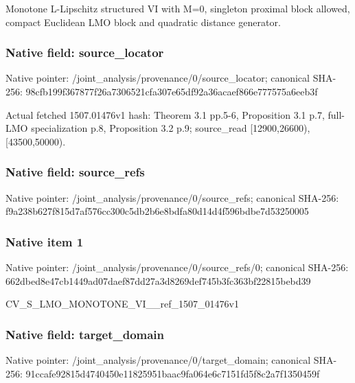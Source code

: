 \documentclass[10pt,a4paper]{article}
\begin{document}
\begingroup\raggedright\sloppy Monotone L-Lipschitz structured VI with M=\allowbreak{}0,\allowbreak{} singleton proximal block allowed,\allowbreak{} compact Euclidean LMO block and quadratic distance generator.\par\endgroup

\subsubsection{Native field: source\_\allowbreak{}locator}
Native pointer: /joint\_\allowbreak{}analysis/provenance/0/source\_\allowbreak{}locator; canonical SHA-256: 98cfb199f367877f26a7306521cfa307e65df92a36acaef866e777575a6eeb3f

\begingroup\raggedright\sloppy Actual fetched 1507.01476v1 hash:\allowbreak{} Theorem 3.1 pp.5-6,\allowbreak{} Proposition 3.1 p.7,\allowbreak{} full-LMO specialization p.8,\allowbreak{} Proposition 3.2 p.9;\allowbreak{} source\_\allowbreak{}read [12900,\allowbreak{}26600),\allowbreak{} [43500,\allowbreak{}50000).\par\endgroup

\subsubsection{Native field: source\_\allowbreak{}refs}
Native pointer: /joint\_\allowbreak{}analysis/provenance/0/source\_\allowbreak{}refs; canonical SHA-256: f9a238b627f815d7af576cc300c5db2b6e8bdfa80d14d4f596bdbe7d53250005

\subsubsection{Native item 1}
Native pointer: /joint\_\allowbreak{}analysis/provenance/0/source\_\allowbreak{}refs/0; canonical SHA-256: 662dbed8e47cb1449ad07daef87dd27a3d8269def745b3fc363bf22815bebd39

\begingroup\raggedright\sloppy CV\_\allowbreak{}S\_\allowbreak{}LMO\_\allowbreak{}MONOTONE\_\allowbreak{}VI\_\allowbreak{}\_\allowbreak{}ref\_\allowbreak{}1507\_\allowbreak{}01476v1\par\endgroup

\subsubsection{Native field: target\_\allowbreak{}domain}
Native pointer: /joint\_\allowbreak{}analysis/provenance/0/target\_\allowbreak{}domain; canonical SHA-256: 91ccafe92815d4740450e11825951baac9fa064e6c7151fd5f8c2a7f1350459f
\end{document}
